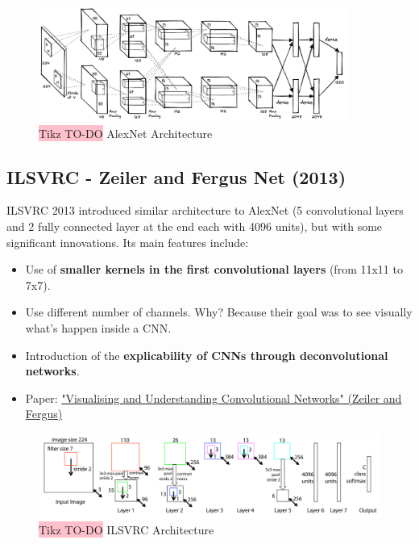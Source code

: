 \begin{figure}[!htbp]
    \centering
    \includegraphics[width=0.9\textwidth]{tikz/chapter5 - AlexNet.png}
    \caption{{\color{red}\colorbox{pink}{Tikz TO-DO}} AlexNet Architecture}
\end{figure}


\subsection{ILSVRC - Zeiler and Fergus Net (2013)}
ILSVRC 2013 introduced similar architecture to AlexNet (5 convolutional layers and 2 fully connected layer at the end each with 4096 units), but with some significant innovations. Its main features include:
\begin{itemize}
    \item Use of \textbf{smaller kernels in the first convolutional layers} (from 11x11 to 7x7).
    \item Use different number of channels. Why? Because their goal was to see visually what's happen inside a CNN.
    \item Introduction of the \textbf{explicability of CNNs through deconvolutional networks}.
    \item Paper: \href{https://arxiv.org/pdf/1311.2901.pdf}{"Visualising and Understanding Convolutional Networks" (Zeiler and Fergus)}
\end{itemize}

\begin{figure}[!htbp]
    \centering
    \includegraphics[width=\textwidth]{tikz/chapter5 - ILSVRC.png}
    \caption{{\color{red}\colorbox{pink}{Tikz TO-DO}} ILSVRC Architecture}
\end{figure}

